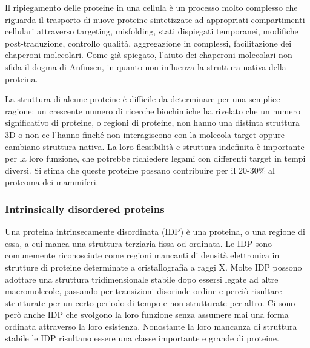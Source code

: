 {
{

Il ripiegamento delle proteine in una cellula è un processo molto complesso che riguarda il trasporto di nuove proteine sintetizzate ad appropriati compartimenti cellulari attraverso targeting, misfolding, stati dispiegati temporanei, modifiche post-traduzione, controllo qualità, aggregazione in complessi, facilitazione dei chaperoni molecolari. Come già spiegato, l'aiuto dei chaperoni molecolari non sfida il dogma di Anfinsen, in quanto non influenza la struttura nativa della proteina.
	
\par La struttura di alcune proteine è difficile da determinare per una semplice ragione: un crescente numero di ricerche biochimiche ha rivelato che un numero significativo di proteine, o regioni di proteine, non hanno una distinta struttura 3D o non ce l'hanno finché non interagiscono con la molecola target oppure cambiano struttura nativa. La loro flessibilità e struttura indefinita è importante per la loro funzione, che potrebbe richiedere legami con differenti target in tempi diversi. Si stima che queste proteine possano contribuire per il 20-30\% al proteoma dei mammiferi.
}
\subsubsection{Intrinsically disordered proteins}
Una proteina intrinsecamente disordinata (IDP) è una proteina, o una regione di essa, a cui manca una struttura terziaria fissa od ordinata. Le IDP sono comunemente riconosciute come regioni mancanti di densità elettronica in strutture di proteine determinate a cristallografia a raggi X. Molte IDP possono adottare una struttura tridimensionale stabile dopo essersi legate ad altre macromolecole, passando per transizioni disorinde-ordine e perciò risultare strutturate per un certo periodo di tempo e non strutturate per altro. Ci sono però anche IDP che svolgono la loro funzione senza assumere mai una forma ordinata attraverso la loro esistenza.
Nonostante la loro mancanza di struttura stabile le IDP risultano essere una classe importante e grande di proteine.


}
